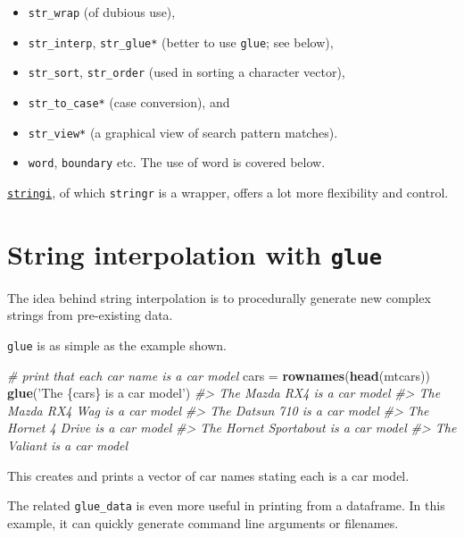 \documentclass[]{book}
\newenvironment{Shaded}{}{}
\newcommand{\CommentTok}[1]{\textcolor[rgb]{0.38,0.63,0.69}{\textit{#1}}}
\newcommand{\KeywordTok}[1]{\textcolor[rgb]{0.00,0.44,0.13}{\textbf{#1}}}
\newcommand{\NormalTok}[1]{#1}
\newcommand{\StringTok}[1]{\textcolor[rgb]{0.25,0.44,0.63}{#1}}
\begin{document}
\begin{itemize}
\item
  \texttt{str\_wrap} (of dubious use),
\item
  \texttt{str\_interp}, \texttt{str\_glue*} (better to use \texttt{glue}; see below),
\item
  \texttt{str\_sort}, \texttt{str\_order} (used in sorting a character vector),
\item
  \texttt{str\_to\_case*} (case conversion), and
\item
  \texttt{str\_view*} (a graphical view of search pattern matches).
\item
  \texttt{word}, \texttt{boundary} etc. The use of word is covered below.
\end{itemize}

\href{https://cran.r-project.org/web/packages/stringi/}{\texttt{stringi}}, of which \texttt{stringr} is a wrapper, offers a lot more flexibility and control.

\hypertarget{string-interpolation-with-glue}{%
\section{\texorpdfstring{String interpolation with \texttt{glue}}{String interpolation with glue}}\label{string-interpolation-with-glue}}

The idea behind string interpolation is to procedurally generate new complex strings from pre-existing data.

\texttt{glue} is as simple as the example shown.

\begin{Shaded}
\begin{Highlighting}[]
\CommentTok{# print that each car name is a car model}
\NormalTok{cars =}\StringTok{ }\KeywordTok{rownames}\NormalTok{(}\KeywordTok{head}\NormalTok{(mtcars))}
\KeywordTok{glue}\NormalTok{(}\StringTok{'The \{cars\} is a car model'}\NormalTok{)}
\CommentTok{#> The Mazda RX4 is a car model}
\CommentTok{#> The Mazda RX4 Wag is a car model}
\CommentTok{#> The Datsun 710 is a car model}
\CommentTok{#> The Hornet 4 Drive is a car model}
\CommentTok{#> The Hornet Sportabout is a car model}
\CommentTok{#> The Valiant is a car model}
\end{Highlighting}
\end{Shaded}

This creates and prints a vector of car names stating each is a car model.

The related \texttt{glue\_data} is even more useful in printing from a dataframe.
In this example, it can quickly generate command line arguments or filenames.
\end{document}
